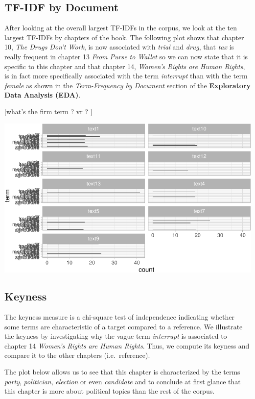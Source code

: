 \documentclass[
]{article}
\begin{document}
\hypertarget{tf-idf-by-document}{%
\subsection{TF-IDF by Document}\label{tf-idf-by-document}}

After looking at the overall largest TF-IDFs in the corpus, we look at
the ten largest TF-IDFs by chapters of the book. The following plot
shows that chapter 10, \emph{The Drugs Don't Work}, is now associated
with \emph{trial} and \emph{drug}, that \emph{tax} is really frequent in
chapter 13 \emph{From Purse to Wallet} so we can now state that it is
specific to this chapter and that chapter 14, \emph{Women's Rights are
Human Rights}, is in fact more specifically associated with the term
\emph{interrupt} than with the term \emph{female} as shown in the
\emph{Term-Frequency by Document} section of the \textbf{Exploratory
Data Analysis (EDA)}.

{[}what's the firm term ? vr ? {]}

\begin{center}\includegraphics[width=0.7\linewidth]{report_files/figure-latex/tfidf by document plot-1} \end{center}

\hypertarget{keyness}{%
\subsection{Keyness}\label{keyness}}

The keyness measure is a chi-square test of independence indicating
whether some terms are characteristic of a target compared to a
reference. We illustrate the keyness by investigating why the vague term
\emph{interrupt} is associated to chapter 14 \emph{Women's Rights are
Human Rights}. Thus, we compute its keyness and compare it to the other
chapters (i.e.~reference).

The plot below allows us to see that this chapter is characterized by
the terms \emph{party}, \emph{politician}, \emph{election} or even
\emph{candidate} and to conclude at first glance that this chapter is
more about political topics than the rest of the corpus.
\end{document}
